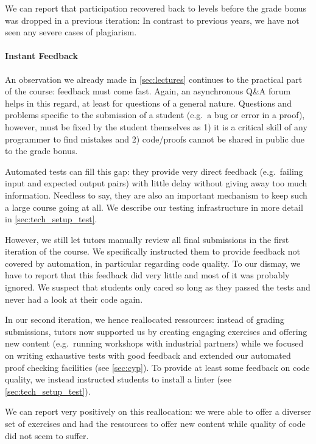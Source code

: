 We can report that participation recovered
back to levels before the grade bonus was dropped in a previous iteration:
In contrast to previous years,
we have not seen any severe cases of plagiarism.

\paragraph{Instant Feedback}
An observation we already made in \cref{sec:lectures}
continues to the practical part of the course:
feedback must come fast.
Again, an asynchronous Q\&A forum helps in this regard,
at least for questions of a general nature.
Questions and problems specific to the submission of a student (e.g.\ a bug or error in a proof),
however, must be fixed by the student themselves as 1) it is a critical skill of any programmer to find mistakes and 2) code/proofs cannot be shared in public due to the grade bonus.

Automated tests can fill this gap:
they provide very direct feedback (e.g.\ failing input and expected output pairs) with little delay
without giving away too much information.
Needless to say, they are also an important mechanism to keep such a large
course going at all.
We describe our testing infrastructure in more detail in \cref{sec:tech_setup_test}.

However, we still let tutors manually review all final submissions
in the first iteration of the course.
We specifically instructed them to provide feedback not covered by automation,
in particular regarding code quality.
To our dismay, we have to report that this feedback did very little and
most of it was probably ignored.
We suspect that students only cared so long as they passed the tests
and never had a look at their code again.

In our second iteration, we hence reallocated ressources:
instead of grading submissions,
tutors now supported us by creating engaging exercises
and offering new content (e.g.\ running workshops with industrial partners)
while we focused on writing exhaustive tests with good feedback and extended our automated proof checking facilities (see \cref{sec:cyp}).
To provide at least some feedback on
code quality, we instead instructed students
to install a linter (see \cref{sec:tech_setup_test}).

We can report very positively on this reallocation:
we were able to offer a diverser set of exercises and
had the ressources to offer new content
while quality of code did not seem to suffer.


